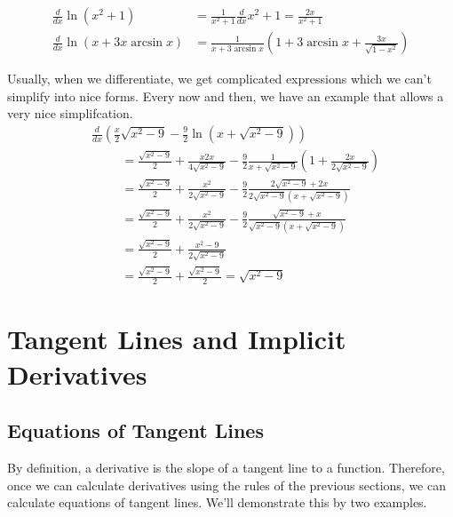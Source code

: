 \documentclass[fleqn]{report}
\begin{document}
\begin{example}
\begin{align*}
\frac{d}{dx} \ln(x^2+1) & = \frac{1}{x^2+1} \frac{d}{dx} x^2+1 =
\frac{2x}{x^2+1} \\
\frac{d}{dx} \ln (x + 3x \arcsin x) & = \frac{1}{x+3\arcsin x}
\left( 1 + 3\arcsin x + \frac{3x}{\sqrt{1-x^2}} \right) 
\end{align*}
\end{example}

\begin{example}
Usually, when we differentiate, we get complicated expressions
which we can't simplify into nice forms. Every now and then,
we have an example that allows a very nice simplifcation.
\begin{align*}
& \frac{d}{dx} \left( \frac{x}{2} \sqrt{x^2-9} - \frac{9}{2} \ln(
x + \sqrt{x^2-9} ) \right) \\
& \hspace{1cm} = \frac{\sqrt{x^2-9}}{2} + \frac{x
2x}{4\sqrt{x^2-9}} - \frac{9}{2} \frac{1}{x+ \sqrt{x^2-9}}
\left( 1 + \frac{2x}{2\sqrt{x^2-9}} \right) \\
& \hspace{1cm} = \frac{\sqrt{x^2-9}}{2} +
\frac{x^2}{2\sqrt{x^2-9}} - \frac{9}{2} 
\frac{2 \sqrt{x^2-9} + 2x}{2\sqrt{x^2-9}(x+ \sqrt{x^2-9})} \\
& \hspace{1cm} = \frac{\sqrt{x^2-9}}{2} +
\frac{x^2}{2\sqrt{x^2-9}} - \frac{9}{2} 
\frac{\sqrt{x^2-9} + x}{\sqrt{x^2-9}(x+ \sqrt{x^2-9})} \\
& \hspace{1cm} = \frac{\sqrt{x^2-9}}{2} +
\frac{x^2-9}{2\sqrt{x^2-9}} \\
& \hspace{1cm} = \frac{\sqrt{x^2-9}}{2} +
\frac{\sqrt{x^2-9}}{2} = \sqrt{x^2-9}
\end{align*}
\end{example}

\chapter{Tangent Lines and Implicit Derivatives}
\label{Implicit Derivatives}

\section*{Equations of Tangent Lines}

By definition, a derivative is the slope of a tangent line to
a function. Therefore, once we can calculate derivatives using
the rules of the previous sections, we can calculate equations
of tangent lines. We'll demonstrate this by two examples.
\end{document}
